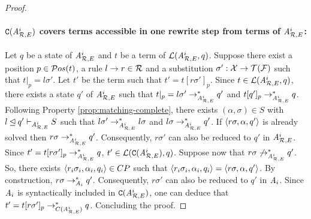 \begin{proof}
  \paragraph{$\mathtt{C}({\it A}_{\mathcal R,E}^i)$  covers terms accessible in one rewrite step from terms of  ${\it A}_{\mathcal R,E}^i$:}
  Let $q$ be a state of ${\it A}_{\mathcal R,E}^i$ and $t$ be a term of
  $\mathcal{L}({\it A}_{\mathcal R,E}^i,q)$.  Suppose there exist a position $p\in
  \mathcal{ P}os(t)$, a rule $l\rightarrow r\in\mathcal R$ and a substitution $\sigma':\mathcal X\rightarrow \mathcal{T(F)}$
  such that $t|_p=l\sigma'$.  Let $t'$ be the term such that
  $t'=t[r\sigma']_p$.  Since $t\in \mathcal{L}({\it A}_{\mathcal R,E}^i,q)$, there exists a
  state $q'$ of ${\it A}_{\mathcal R,E}^i$ such that $t|_p=l\sigma'\rightarrow^*_{{\it A}_{\mathcal R,E}^i}
  q'$ and $t[q']_p\rightarrow^*_{{\it A}_{\mathcal R,E}^i}q$.  Following Property
  \ref{prop:matching-complete}, there exists $(\alpha,\sigma)\in S$
  with $l\unlhd q'\vdash_{{\it A}_{\mathcal R,E}^i}S$ such that
  $l\sigma'\rightarrow^*_{{\it A}_{\mathcal R,E}^i}l\sigma$ and $l\sigma\rightarrow^*_{{\it A}_{\mathcal R,E}^i} q'$.
  If $\langle r\sigma,\alpha,q' \rangle$ is already solved then
  $r\sigma\rightarrow^*_{{\it A}_{\mathcal R,E}^i}q'$. Consequently, $r\sigma'$ can also be
  reduced to $q'$ in ${\it A}_{\mathcal R,E}^i$. Since
  $t'=t[r\sigma']_p\rightarrow^*_{{\it A}_{\mathcal R,E}^i}q$, $t'\in
  \mathcal{L}(\mathtt{C}({\it A}_{\mathcal R,E}^i),q)$. Suppose now that
  $r\sigma\not\rightarrow^*_{{\it A}_{\mathcal R,E}^i}q'$.  So, there exists $\langle r_i\sigma_
  i,\alpha_i,q_i\rangle\in CP$ such that $\langle r_i\sigma_
  i,\alpha_i,q_i\rangle=\langle r\sigma,\alpha,q'\rangle$.  By construction,
  $r\sigma\rightarrow^*_{\mathit A_i}q'$. Consequently, $r\sigma'$ can also be
  reduced to $q'$ in $\mathit A_i$. Since $\mathit A_i$ is syntactically included in $\mathtt{C}({\it A}_{\mathcal R,E}^i)$, one can deduce that 
  $t'=t[r\sigma']_p\rightarrow^*_{C({\it A}_{\mathcal R,E}^i)}q$. 
  Concluding the proof.
\end{proof}

\medskip

\setcounter{theorem}{\thesavetheorem}









